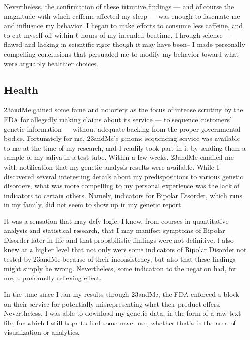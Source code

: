 \documentclass{article}
\begin{document}
Nevertheless,
the confirmation of these intuitive findings
--- and of course the magnitude with which caffeine affected my sleep ---
was enough to fascinate me and influence my behavior.
I began to make efforts to consume less caffeine,
and to cut myself off within 6 hours of my intended bedtime.
 Through science
 --- flawed and lacking in scientific rigor though it may have been– I made personally compelling conclusions that persuaded me to modify my behavior toward what were arguably healthier choices.

\subsection*{Health}
23andMe gained some fame and notoriety as the focus of intense scrutiny by the FDA for allegedly making claims about its service
--- to sequence customers' genetic information ---
without adequate backing from the proper governmental bodies.
Fortunately for me,
23andMe's genome sequencing service was available to me at the time of my research,
and I readily took part in it by sending them a sample of my saliva in a test tube.
Within a few weeks,
23andMe emailed me with notification that my genetic analysis results were available.
While I discovered several interesting details about my predispositions to various genetic disorders,
what was more compelling to my personal experience was the lack of indicators to certain others.
Namely,
indicators for Bipolar Disorder,
which runs in my family,
did not seem to show up in my genetic report.

It was a sensation that may defy logic;
I knew,
from courses in quantitative analysis and statistical research,
that I may manifest symptoms of Bipolar Disorder later in life and that probabilistic findings were not definitive.
I also knew at a higher level that not only were some indicators of Bipolar Disorder not tested by 23andMe because of their inconsistency,
but also that these findings might simply be wrong.
Nevertheless,
some indication to the negation had,
for me,
a profoundly relieving effect.

In the time since I ran my results through 23andMe,
the FDA enforced a block on their service for potentially misrepresenting what their product offers.
Nevertheless,
I was able to download my genetic data,
in the form of a raw text file,
for which I still hope to find some novel use,
whether that's in the area of visualization or analytics.
\end{document}

